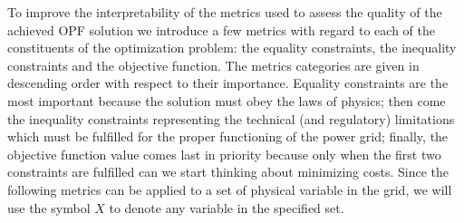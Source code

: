 To improve the interpretability of the metrics used to assess the quality of the achieved OPF solution
we introduce a few metrics with regard to each of the constituents of the optimization problem:
the equality constraints, the inequality constraints and the objective function.
The metrics categories are given in descending order with respect to their importance.
Equality constraints are the most important because the solution must obey the laws of physics;
then come the inequality constraints representing the technical (and regulatory) limitations
which must be fulfilled for the proper functioning of the power grid;
finally, the objective function value comes last in priority because only when the
first two constraints are fulfilled can we start thinking about minimizing costs.
Since the following metrics can be applied to a set of physical variable in the grid,
we will use the symbol $X$ to denote any variable in the specified set.